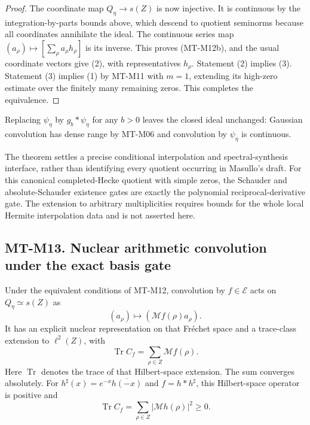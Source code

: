 \documentclass[11pt,a4paper]{article}
\begin{document}
\begin{proof}
The coordinate map $Q_\eta\to s(Z)$ is now injective.
It is continuous by the integration-by-parts bounds above,
which descend to quotient seminorms because all coordinates
annihilate the ideal. The continuous series map
$(a_\rho)\mapsto[\sum_\rho a_\rho h_\rho]$ is its inverse.
This proves (MT-M12b), and the usual coordinate vectors
give (2), with representatives $h_\rho$.
Statement (2) implies (3). Statement (3) implies (1)
by MT-M11 with $m=1$, extending its high-zero estimate
over the finitely many remaining zeros. This completes
the equivalence.
\end{proof}

Replacing $\psi_\eta$ by
$g_b*\psi_\eta$ for any $b>0$ leaves the closed ideal unchanged:
Gaussian convolution has dense range by MT-M06 and convolution
by $\psi_\eta$ is continuous.

The theorem settles a precise conditional interpolation and
spectral-synthesis interface, rather than identifying every
quotient occurring in Masullo's draft. For this canonical
completed-Hecke quotient with simple zeros, the Schauder and
absolute-Schauder existence gates are exactly the polynomial
reciprocal-derivative gate. The extension to arbitrary
multiplicities requires bounds for the whole local Hermite
interpolation data and is not asserted here.

\subsection*{MT-M13. Nuclear arithmetic convolution under the exact basis gate}
Under the equivalent conditions of MT-M12, convolution by
$f\in\mathcal E$ acts on $Q_\eta\simeq s(Z)$ as
\[
            (a_\rho)\longmapsto
                         (\mathcal Mf(\rho)a_\rho).
\]
It has an explicit nuclear representation on that Fr\'echet
space and a trace-class extension to $\ell^2(Z)$, with
\[
                   \operatorname{Tr}C_f
                         =\sum_{\rho\in Z}\mathcal Mf(\rho).
                                                               \tag{MT-M13}
\]
Here $\operatorname{Tr}$ denotes the trace of that Hilbert-space extension.
The sum converges absolutely. For
$h^\sharp(x)=e^{-x}\overline{h(-x)}$ and
$f=h*h^\sharp$, this Hilbert-space operator is positive and
\[
                   \operatorname{Tr}C_f
                         =\sum_{\rho\in Z}|\mathcal Mh(\rho)|^2
                         \ge0.
\]
\end{document}
